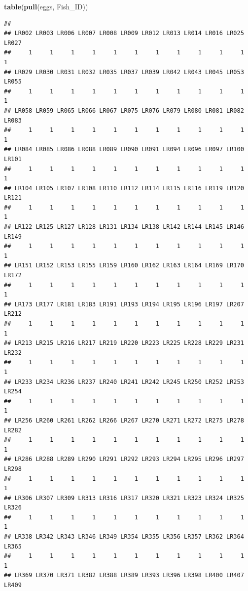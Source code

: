 \documentclass[]{book}
\newenvironment{Shaded}{\begin{snugshade}}{\end{snugshade}}
\newcommand{\KeywordTok}[1]{\textcolor[rgb]{0.13,0.29,0.53}{\textbf{#1}}}
\newcommand{\NormalTok}[1]{#1}
\begin{document}
\begin{Shaded}
\begin{Highlighting}[]
\KeywordTok{table}\NormalTok{(}\KeywordTok{pull}\NormalTok{(eggs, Fish_ID))}
\end{Highlighting}
\end{Shaded}

\begin{verbatim}
## 
## LR002 LR003 LR006 LR007 LR008 LR009 LR012 LR013 LR014 LR016 LR025 LR027 
##     1     1     1     1     1     1     1     1     1     1     1     1 
## LR029 LR030 LR031 LR032 LR035 LR037 LR039 LR042 LR043 LR045 LR053 LR055 
##     1     1     1     1     1     1     1     1     1     1     1     1 
## LR058 LR059 LR065 LR066 LR067 LR075 LR076 LR079 LR080 LR081 LR082 LR083 
##     1     1     1     1     1     1     1     1     1     1     1     1 
## LR084 LR085 LR086 LR088 LR089 LR090 LR091 LR094 LR096 LR097 LR100 LR101 
##     1     1     1     1     1     1     1     1     1     1     1     1 
## LR104 LR105 LR107 LR108 LR110 LR112 LR114 LR115 LR116 LR119 LR120 LR121 
##     1     1     1     1     1     1     1     1     1     1     1     1 
## LR122 LR125 LR127 LR128 LR131 LR134 LR138 LR142 LR144 LR145 LR146 LR149 
##     1     1     1     1     1     1     1     1     1     1     1     1 
## LR151 LR152 LR153 LR155 LR159 LR160 LR162 LR163 LR164 LR169 LR170 LR172 
##     1     1     1     1     1     1     1     1     1     1     1     1 
## LR173 LR177 LR181 LR183 LR191 LR193 LR194 LR195 LR196 LR197 LR207 LR212 
##     1     1     1     1     1     1     1     1     1     1     1     1 
## LR213 LR215 LR216 LR217 LR219 LR220 LR223 LR225 LR228 LR229 LR231 LR232 
##     1     1     1     1     1     1     1     1     1     1     1     1 
## LR233 LR234 LR236 LR237 LR240 LR241 LR242 LR245 LR250 LR252 LR253 LR254 
##     1     1     1     1     1     1     1     1     1     1     1     1 
## LR256 LR260 LR261 LR262 LR266 LR267 LR270 LR271 LR272 LR275 LR278 LR282 
##     1     1     1     1     1     1     1     1     1     1     1     1 
## LR286 LR288 LR289 LR290 LR291 LR292 LR293 LR294 LR295 LR296 LR297 LR298 
##     1     1     1     1     1     1     1     1     1     1     1     1 
## LR306 LR307 LR309 LR313 LR316 LR317 LR320 LR321 LR323 LR324 LR325 LR326 
##     1     1     1     1     1     1     1     1     1     1     1     1 
## LR338 LR342 LR343 LR346 LR349 LR354 LR355 LR356 LR357 LR362 LR364 LR365 
##     1     1     1     1     1     1     1     1     1     1     1     1 
## LR369 LR370 LR371 LR382 LR388 LR389 LR393 LR396 LR398 LR400 LR407 LR409 

\end{verbatim}
\end{document}
